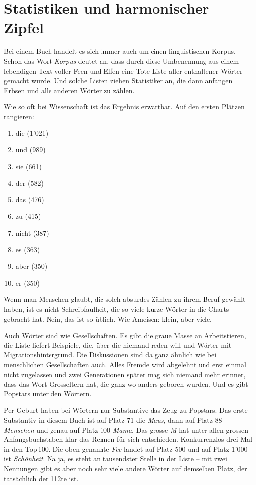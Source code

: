 \chapter*{\large\textsf{Statistiken und harmonischer Zipfel}}
        \thispagestyle{empty}

Bei einem Buch handelt es sich immer auch um einen linguistischen Korpus. Schon
das Wort \emph{Korpus} deutet an, dass durch diese Umbenennung aus einem
lebendigen Text voller Feen und Elfen eine Tote Liste aller enthaltener Wörter
gemacht wurde. Und solche Listen ziehen Statistiker an, die dann anfangen
Erbsen und alle anderen Wörter zu zählen.

Wie so oft bei Wissenschaft ist das Ergebnis erwartbar. Auf den ersten Plätzen
rangieren:

\begin{enumerate}
    \item die (1'021)
    \item und (989)
    \item sie (661)
    \item der (582)
    \item das (476)
    \item zu (415)
    \item nicht (387)
    \item es (363)
    \item aber (350)
    \item er (350)
\end{enumerate}

Wenn man Menschen glaubt, die solch absurdes Zählen zu ihrem Beruf gewählt
haben, ist es nicht Schreibfaulheit, die so viele kurze Wörter in die Charts
gebracht hat. Nein, das ist so üblich. Wie Ameisen: klein, aber viele.

Auch Wörter sind wie Gesellschaften. Es gibt die graue Masse an Arbeitstieren, die
Liste liefert Beispiele, die, über die niemand reden will und Wörter mit
Migrationshintergrund. Die Diskussionen sind da ganz ähnlich wie bei
menschlichen Gesellschaften auch. Alles Fremde wird abgelehnt und erst einmal
nicht zugelassen und zwei Generationen später mag sich niemand mehr erinner,
dass das Wort Grosseltern hat,  die ganz wo anders geboren wurden. Und es gibt
Popstars unter den Wörtern. 

Per Geburt haben bei Wörtern nur Substantive das
Zeug zu Popstars. Das erste Substantiv in diesem Buch ist auf Platz 71 die \emph{Maus}, dann auf Platz 88
\emph{Menschen} und genau auf Platz 100 \emph{Mama}. Das grosse \emph{M} hat
unter allen grossen Anfangsbuchstaben
klar das Rennen für sich entschieden. Konkurrenzlos drei Mal in den Top\,100.
Die oben genannte \emph{Fee} landet auf Platz 500 und auf Platz 1'000 ist
\emph{Schönheit}. Na ja, es steht an tausendster Stelle in der Liste -- mit zwei
Nennungen gibt es aber noch sehr viele andere Wörter auf demselben Platz, der
tatsächlich der 112te ist.

